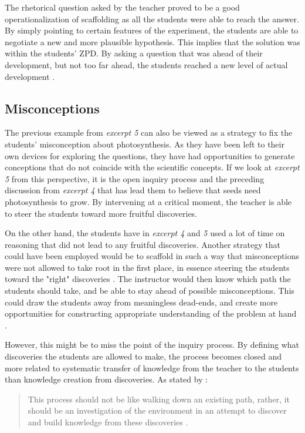 The rhetorical question asked by the teacher proved to be a good operationalization of scaffolding as all the students were able to reach the answer. By simply pointing to certain features of the experiment, the students are able to negotiate a new and more plausible hypothesis. This implies that the solution was within the students' ZPD. By asking a question that was ahead of their development, but not too far ahead, the students reached a new level of actual development  \citep{vygotskiui1978mind}.

\subsection{Misconceptions}
The previous example from \emph{excerpt 5} can also be viewed as a strategy to fix the students' misconception about photosynthesis. As they have been left to their own devices for exploring the questions, they have had opportunities to generate conceptions that do not coincide with the scientific concepts. If we look at \emph{excerpt 5} from this perspective, it is the open inquiry process and the preceding discussion from \emph{excerpt 4} that has lead them to believe that seeds need photosynthesis to grow. By intervening at a critical moment, the teacher is able to steer the students toward more fruitful discoveries. 

On the other hand, the students have in \emph{excerpt 4} and \emph{5} used a lot of time on reasoning that did not lead to any fruitful discoveries. Another strategy that could have been employed would be to scaffold in such a way that misconceptions were not allowed to take root in the first place, in essence steering the students toward the "right" discoveries \citep{kluge2010simulation}. The instructor would then know which path the students should take, and be able to stay ahead of possible misconceptions. This could draw the students away from meaningless dead-ends, and create more opportunities for constructing appropriate understanding of the problem at hand \citep{kluge2010simulation}.

However, this might be to miss the point of the inquiry process. By defining what discoveries the students are allowed to make, the process becomes closed and more related to systematic transfer of knowledge from the teacher to the students than knowledge creation from discoveries. As stated by \citeauthor{de1998scientific}: \begin{quote}This process should not be like walking down an existing path, rather, it should be an investigation of the environment in an attempt to discover and build knowledge from these discoveries \citetext{\citealp{de1998scientific}, referenced in \citealp{kluge2010simulation}, p. 246}.
\end{quote}

